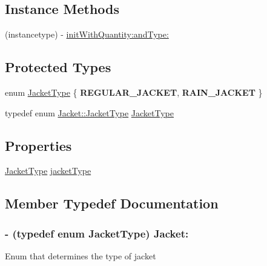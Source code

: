 \subsection*{Instance Methods}
\begin{DoxyCompactItemize}
\item 
(instancetype) -\/ \hyperlink{interface_jacket_a5ae08dd2d336631608f31a675aada7f2}{init\-With\-Quantity\-:and\-Type\-:}
\end{DoxyCompactItemize}
\subsection*{Protected Types}
\begin{DoxyCompactItemize}
\item 
enum \hyperlink{interface_jacket_aae6f82fb0837e920b3603daff9875e9d}{Jacket\-Type} \{ {\bfseries R\-E\-G\-U\-L\-A\-R\-\_\-\-J\-A\-C\-K\-E\-T}, 
{\bfseries R\-A\-I\-N\-\_\-\-J\-A\-C\-K\-E\-T}
 \}
\item 
typedef enum \hyperlink{interface_jacket_aae6f82fb0837e920b3603daff9875e9d}{Jacket\-::\-Jacket\-Type} \hyperlink{interface_jacket_a916d1c744ed83f3abccebe9cee3f01f8}{Jacket\-Type}
\end{DoxyCompactItemize}
\subsection*{Properties}
\begin{DoxyCompactItemize}
\item 
\hyperlink{interface_jacket_aae6f82fb0837e920b3603daff9875e9d}{Jacket\-Type} \hyperlink{interface_jacket_a8c95ba56f0f5c9c0c852178763301259}{jacket\-Type}
\end{DoxyCompactItemize}


\subsection{Member Typedef Documentation}
\hypertarget{interface_jacket_a916d1c744ed83f3abccebe9cee3f01f8}{
\subsubsection[{Jacket\-Type}]{\setlength{\rightskip}{0pt plus 5cm}-\/ (typedef enum {\bf Jacket\-Type})  Jacket\-:\hspace{0.3cm}{\ttfamily [protected]}}}\label{interface_jacket_a916d1c744ed83f3abccebe9cee3f01f8}
Enum that determines the type of jacket 


